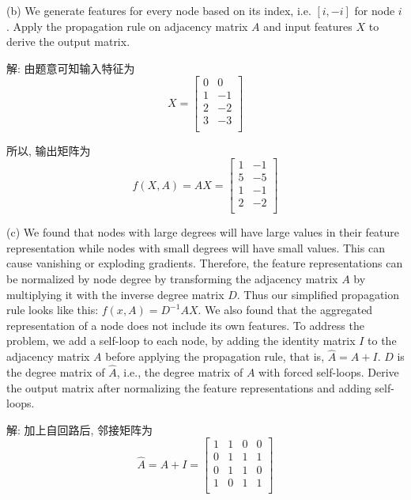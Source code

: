 \documentclass[openany]{ctexbook}
\theoremstyle{kaiti}
\theoremstyle{normal}
\begin{document}
(b) We generate features for every node based on its index, i.e. $[i, -i]$ for node $i$.  Apply the propagation rule on adjacency matrix $A$ and input features $X$ to derive the output matrix.

解: 由题意可知输入特征为
\begin{equation}
  X=\begin{bmatrix}
    0 &  0 \\
    1 & -1 \\
    2 & -2 \\
    3 & -3 \\
  \end{bmatrix}
\end{equation}

所以, 输出矩阵为
\begin{equation}
  f(X,A)=AX
  =\begin{bmatrix}
    1 & -1 \\
    5 & -5 \\
    1 & -1 \\
    2 & -2 \\
  \end{bmatrix}
\end{equation}

(c) We found that nodes with large degrees will have large values in their feature representation while nodes with small degrees will have small values. This can cause vanishing or exploding gradients. Therefore, the feature representations can be normalized by node degree by transforming the adjacency matrix $A$ by multiplying it with the inverse degree matrix $D$. Thus our simplified propagation rule looks like this: $f(x,A) = D^{-1}AX$. We also found that the aggregated representation of a node does not include its own features. To address the problem, we add a self-loop to each node, by adding the identity matrix $I$ to the adjacency matrix $A$ before applying the propagation rule, that is, $\hat{A} = A + I$. $\hat{D}$ is the degree matrix of $\hat{A}$, i.e., the degree matrix of $A$ with forced self-loops. Derive the output matrix after normalizing the feature representations and adding self-loops.

解: 加上自回路后, 邻接矩阵为
\begin{equation}
  \hat{A}=A+I
  =\begin{bmatrix}
    1 & 1 & 0 & 0 \\
    0 & 1 & 1 & 1 \\
    0 & 1 & 1 & 0 \\
    1 & 0 & 1 & 1 \\
  \end{bmatrix}
\end{equation}
\end{document}
